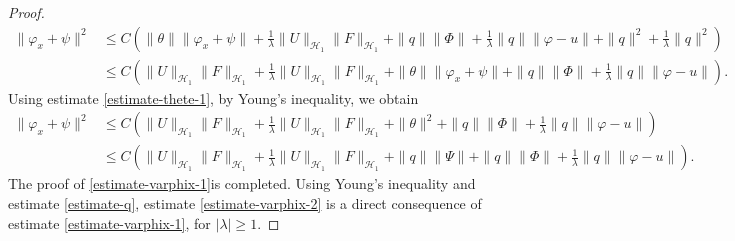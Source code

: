 \documentclass[11pt,reqno]{article}
\begin{document}
\begin{proof}
\begin{align*}
  		\|\varphi_x + \psi\|^2 &\leq C\left(\|\theta\|\|\varphi_x + \psi\| + \frac{1}{\lambda}\|U\|_{\mathcal{H}_1}\|F\|_{\mathcal{H}_1} + \|q\|\|\Phi\| + \frac{1}{\lambda}\|q\|\|\varphi - u\| + \|q\|^2 + \frac{1}{\lambda}\|q\|^2\right) \\
  		&\leq C\left(\|U\|_{\mathcal{H}_1}\|F\|_{\mathcal{H}_1} + \frac{1}{\lambda}\|U\|_{\mathcal{H}_1}\|F\|_{\mathcal{H}_1} + \|\theta\|\|\varphi_x + \psi\| + \|q\|\|\Phi\| + \frac{1}{\lambda}\|q\|\|\varphi - u\|\right).
  	\end{align*}
  	Using estimate \eqref{estimate-thete-1}, by Young's inequality, we obtain
  	\begin{align*}
  		\|\varphi_x + \psi\|^2 &\leq C\left(\|U\|_{\mathcal{H}_1}\|F\|_{\mathcal{H}_1} + \frac{1}{\lambda}\|U\|_{\mathcal{H}_1}\|F\|_{\mathcal{H}_1} + \|\theta\|^2 + \|q\|\|\Phi\| + \frac{1}{\lambda}\|q\|\|\varphi - u\|\right)\\
  		&\leq C\left(\|U\|_{\mathcal{H}_1}\|F\|_{\mathcal{H}_1} + \frac{1}{\lambda}\|U\|_{\mathcal{H}_1}\|F\|_{\mathcal{H}_1} + \|q\|\|\Psi\| + \|q\|\|\Phi\| + \frac{1}{\lambda}\|q\|\|\varphi - u\|\right).
  	\end{align*}
  	The proof of \eqref{estimate-varphix-1}is completed. Using Young's inequality and estimate \eqref{estimate-q}, estimate \eqref{estimate-varphix-2} is a direct consequence of estimate \eqref{estimate-varphix-1}, for $|\lambda| \geq 1$.
  \end{proof}
\end{document}
